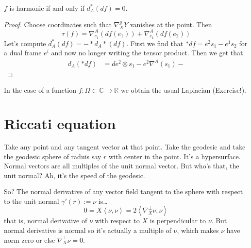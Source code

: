 \begin{lemma}
\label{lemma-harmonic}
$f$ is harmonic if and only if $d_A^*(df)=0$.
\end{lemma}

\begin{proof}
Choose coordinates such that $\nabla^g_XY$
vanishes at the point. Then
$$
\tau(f)=\nabla^A_{e_1}(df(e_1))+
\nabla^A_{e_1}(df(e_2))
$$
Let's compute $d_A^*(df)=-*d_A*(df)$. First
we find that $*df=e^2s_1-e^1s_2$ for
a dual frame $e^i$ and now no longer writing
the tensor product. Then we get
that
$$
\begin{aligned}
d_A(*df)&=de^2\otimes s_1-e^2\nabla^A(s_1)-
\end{aligned}
$$

\end{proof}

\begin{remark}
\label{remark-harmonic-functions}
In the case of a function
$f:\Omega\subset\mathbb{C}\to \mathbb{R}$ we
obtain
the usual Laplacian (Exercise!).
\end{remark}

\section{Riccati equation}
\label{section-Riccati-equation}

Take any point and any tangent vector at that
point. Take the geodesic and take
the geodesic sphere of raduis say $r$ with
center in the point. It's
a hypersurface. Normal vectors are all
multiples of the unit normal vector. But
who's that, the unit normal? Ah, it's the
speed of the geodesic.

So? The normal derivative of any vector field
tangent to the sphere with respect
to the unit normal $\gamma'(r):=\nu$ is…
$$
0=X\left\langle{}\nu,\nu\right\rangle{}=2\left\langle{}\nabla^\perp_X
\nu,\nu\right\rangle{}
$$
that is, normal derivative of $\nu$ with
respect to $X$ is perpendicular to
$\nu$. But normal derivative is normal so
it's actually a multiple of $\nu$,
which makes $\nu$ have norm zero or else
$\nabla^\perp_X \nu=0$.

